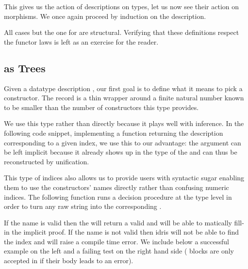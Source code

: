 This gives us the action of descriptions on types, let us now
see their action on morphisms.
%
We once again proceed by induction on the description.


All cases but the one for  are structural.
%
Verifying that these definitions respect the functor laws is left as
an exercise for the reader.

\subsection{ as Trees}

Given a datatype description , our first goal is
to define what it means to pick a constructor.
%
The  record is a thin wrapper around a finite
natural number known to be smaller than the number of constructors
this type provides.


We use this type rather than  directly because it
plays well with inference.
%
In the following code snippet, implementing a function returning
the description corresponding to a given index,
we use this to our advantage:
the  argument can be left implicit because it already
shows up in the type of the  and can thus be
reconstructed by unification.


This type of indices also allows us to provide users with
syntactic sugar enabling them to use the constructors' names
directly rather than confusing numeric indices.
%
The following function runs a decision procedure
 at the type level
in order to turn any raw string 
into the corresponding .


If the name is valid then the  will
return a valid  and \idris{} will be able to
matically fill-in the implicit proof.
%
If the name is not valid then idris will not be able to
find the index and will raise a compile time error.
%
We include below a successful example on the left and a failing test
on the right hand side ( blocks are only
accepted in \idris{} if their body leads to an error).

